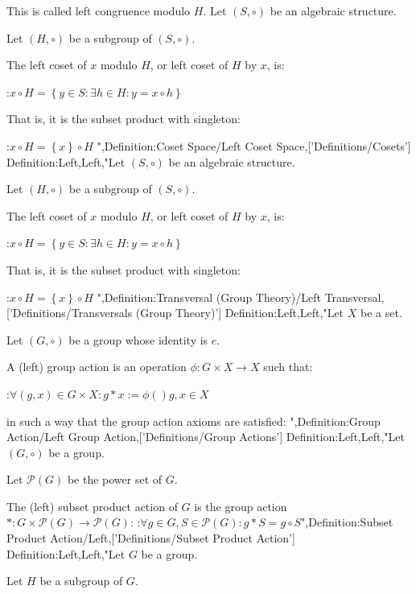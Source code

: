 This is called left congruence modulo $H$.
Let $\left( S, \circ \right)$ be an algebraic structure.

Let $\left( H, \circ \right)$ be a subgroup of $\left( S, \circ \right)$.


The left coset of $x$ modulo $H$, or left coset of $H$ by $x$, is:

:$x \circ H = \left\lbrace y \in S: \exists h \in H: y = x \circ h \right\rbrace$


That is, it is the subset product with singleton:

:$x \circ H = \left\lbrace x \right\rbrace \circ H$
",Definition:Coset Space/Left Coset Space,['Definitions/Cosets']
Definition:Left,Left,"Let $\left( S, \circ \right)$ be an algebraic structure.

Let $\left( H, \circ \right)$ be a subgroup of $\left( S, \circ \right)$.


The left coset of $x$ modulo $H$, or left coset of $H$ by $x$, is:

:$x \circ H = \left\lbrace y \in S: \exists h \in H: y = x \circ h \right\rbrace$


That is, it is the subset product with singleton:

:$x \circ H = \left\lbrace x \right\rbrace \circ H$
",Definition:Transversal (Group Theory)/Left Transversal,['Definitions/Transversals (Group Theory)']
Definition:Left,Left,"Let $X$ be a set.

Let $\left( G, \circ \right)$ be a group whose identity is $e$.


A (left) group action is an operation $\phi: G \times X \to X$ such that:

:$\forall \left( g, x \right) \in G \times X: g * x := \phi \left(   \right){g, x} \in X$

in such a way that the group action axioms are satisfied:
",Definition:Group Action/Left Group Action,['Definitions/Group Actions']
Definition:Left,Left,"Let $\left( G, \circ \right)$ be a group.

Let $\mathcal P \left( G \right)$ be the power set of $G$.


The (left) subset product action of $G$ is the group action $*: G \times \mathcal P \left( G \right) \to \mathcal P \left( G \right)$:
:$\forall g \in G, S \in \mathcal P \left( G \right): g * S = g \circ S$",Definition:Subset Product Action/Left,['Definitions/Subset Product Action']
Definition:Left,Left,"Let $G$ be a group.

Let $H$ be a subgroup of $G$.


